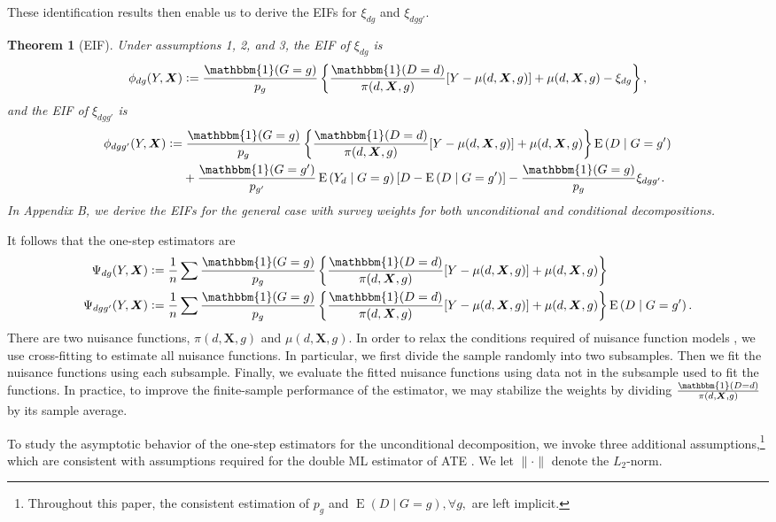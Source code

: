 \documentclass[12pt,a4paper]{article}
\newtheorem{prop}{Theorem}
\newcommand{\E}{\operatorname{E}}
\def\X{{\boldsymbol X}}
\def\one{\mathbbm{1}}
\newcommand{\defeq}{\vcentcolon=}
\begin{document}
These identification results then enable us to derive the EIFs for $\xi_{dg}$ and $\xi_{dgg'}$.
\begin{prop}[EIF]
Under assumptions 1, 2, and 3, the EIF of $\xi_{dg}$ is
$$\phi_{dg}(Y,\X) \defeq \frac{\one(G=g)}{p_g} \left\{ \frac{\one(D=d)}{\pi(d, \X,g)} [Y-\mu(d,\X,g)] + \mu(d,\X,g) - \xi_{dg} \right\},$$ 
and the EIF of $\xi_{dgg'}$ is
\begin{align*}
    \phi_{dgg'}(Y,\X) &\defeq \frac{\one(G=g)}{p_g}  \left\{\frac{\one(D=d)}{\pi(d,\X,g)}[Y-\mu(d,\X,g)] + \mu(d,\X,g) \right\} \E \left(D \mid G=g' \right) \\
    &\phantom{{}={}} + \frac{\one(G=g')}{p_{g'}} \E \left(Y_d \mid G=g \right) \left[D - \E \left(D \mid G=g' \right) \right] - \frac{\one(G=g)}{p_g} \xi_{dgg'}.
\end{align*}
In Appendix B, we derive the EIFs for the general case with survey weights for both unconditional and conditional decompositions. 
\end{prop}
It follows that the one-step estimators are
\begin{align*}
    \Psi_{dg}(Y,\X) &\defeq \frac{1}{n} \sum \frac{\one(G=g)}{p_g} \left\{ \frac{\one(D=d)}{\pi(d, \X,g)} [Y-\mu(d,\X,g)] + \mu(d,\X,g)\right\} \\
    \Psi_{dgg'}(Y,\X) &\defeq \frac{1}{n} \sum \frac{\one(G=g)}{p_g}  \left\{\frac{\one(D=d)}{\pi(d,\X,g)}[Y-\mu(d,\X,g)] + \mu(d,\X,g) \right\} \E \left(D \mid G=g' \right).
\end{align*}
There are two nuisance functions, $\pi(d,\X,g)$ and $\mu(d,\X,g)$. In order to relax the conditions required of nuisance function models \citep{kennedy_semiparametric_2022, chernozhukov_double/debiased_2018}, we use cross-fitting to estimate all nuisance functions. In particular, we first divide the sample randomly into two subsamples. Then we fit the nuisance functions using each subsample. Finally, we evaluate the fitted nuisance functions using data not in the subsample used to fit the functions. In practice, to improve the finite-sample performance of the estimator, we may stabilize the weights by dividing $\frac{\one(D=d)}{\pi(d,\X,g)}$ by its sample average.  

To study the asymptotic behavior of the one-step estimators for the unconditional decomposition, we invoke three additional assumptions,\footnote{Throughout this paper, the consistent estimation of $p_g$ and $\E(D \mid G=g), \forall g,$ are left implicit.} which are consistent with assumptions required for the double ML estimator of ATE \citep{kennedy_semiparametric_2022, chernozhukov_double/debiased_2018}. We let $\| \cdot \|$ denote the $L_2$-norm. 
\end{document}

